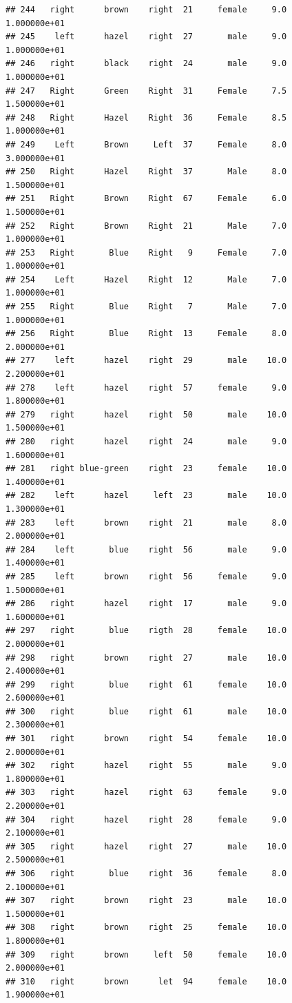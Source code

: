 \documentclass[]{article}
\begin{document}
\begin{verbatim}
## 244   right      brown    right  21     female     9.0  1.000000e+01
## 245    left      hazel    right  27       male     9.0  1.000000e+01
## 246   right      black    right  24       male     9.0  1.000000e+01
## 247   Right      Green    Right  31     Female     7.5  1.500000e+01
## 248   Right      Hazel    Right  36     Female     8.5  1.000000e+01
## 249    Left      Brown     Left  37     Female     8.0  3.000000e+01
## 250   Right      Hazel    Right  37       Male     8.0  1.500000e+01
## 251   Right      Brown    Right  67     Female     6.0  1.500000e+01
## 252   Right      Brown    Right  21       Male     7.0  1.000000e+01
## 253   Right       Blue    Right   9     Female     7.0  1.000000e+01
## 254    Left      Hazel    Right  12       Male     7.0  1.000000e+01
## 255   Right       Blue    Right   7       Male     7.0  1.000000e+01
## 256   Right       Blue    Right  13     Female     8.0  2.000000e+01
## 277    left      hazel    right  29       male    10.0  2.200000e+01
## 278    left      hazel    right  57     female     9.0  1.800000e+01
## 279   right      hazel    right  50       male    10.0  1.500000e+01
## 280   right      hazel    right  24       male     9.0  1.600000e+01
## 281   right blue-green    right  23     female    10.0  1.400000e+01
## 282    left      hazel     left  23       male    10.0  1.300000e+01
## 283    left      brown    right  21       male     8.0  2.000000e+01
## 284    left       blue    right  56       male     9.0  1.400000e+01
## 285    left      brown    right  56     female     9.0  1.500000e+01
## 286   right      hazel    right  17       male     9.0  1.600000e+01
## 297   right       blue    rigth  28     female    10.0  2.000000e+01
## 298   right      brown    right  27       male    10.0  2.400000e+01
## 299   right       blue    right  61     female    10.0  2.600000e+01
## 300   right       blue    right  61       male    10.0  2.300000e+01
## 301   right      brown    right  54     female    10.0  2.000000e+01
## 302   right      hazel    right  55       male     9.0  1.800000e+01
## 303   right      hazel    right  63     female     9.0  2.200000e+01
## 304   right      hazel    right  28     female     9.0  2.100000e+01
## 305   right      hazel    right  27       male    10.0  2.500000e+01
## 306   right       blue    right  36     female     8.0  2.100000e+01
## 307   right      brown    right  23       male    10.0  1.500000e+01
## 308   right      brown    right  25     female    10.0  1.800000e+01
## 309   right      brown     left  50     female    10.0  2.000000e+01
## 310   right      brown      let  94     female    10.0  1.900000e+01

\end{verbatim}
\end{document}
